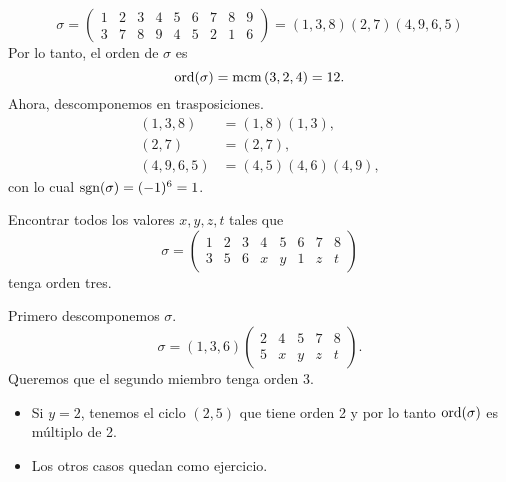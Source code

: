 \begin{ej}
    \[
        \sigma =
        \begin{pmatrix}
            1 & 2 & 3 & 4 & 5 & 6 & 7 & 8 & 9 \\
            3 & 7 & 8 & 9 & 4 & 5 & 2 & 1 & 6
        \end{pmatrix}
        = (1, 3, 8) (2, 7) (4, 9, 6, 5)
    \]
    Por lo tanto, el orden de $\sigma$ es
    \[
        \operatorname{ord}(\sigma) = \operatorname{mcm}\left( 3, 2, 4 \right) = 12.
    \]
    Ahora, descomponemos en trasposiciones.
    \[
        \begin{aligned}
            (1, 3, 8) &= (1, 8) (1, 3), \\
            (2, 7) &= (2, 7), \\
            (4, 9, 6, 5) &= (4, 5) (4, 6) (4, 9),
        \end{aligned}
    \]
    con lo cual $\text{sgn}(\sigma) = (-1)^6 = 1$.
\end{ej}

\begin{ej} %
    Encontrar todos los valores $x, y, z, t$ tales que 
    \[
        \sigma =
        \begin{pmatrix}
            1 & 2 & 3 & 4 & 5 & 6 & 7 & 8 \\
            3 & 5 & 6 & x & y & 1 & z & t
        \end{pmatrix}
    \]
    tenga orden tres.

    Primero descomponemos $\sigma$.
    \[
        \sigma = (1, 3, 6)
        \begin{pmatrix}
            2 & 4 & 5 & 7 & 8 \\
            5 & x & y & z & t
        \end{pmatrix}.
    \]
    Queremos que el segundo miembro tenga orden 3.

    \begin{itemize}
        \item Si $y = 2$, tenemos el ciclo $(2, 5)$ que tiene orden 2 y por lo tanto $\operatorname{ord}(\sigma)$
            es m\'ultiplo de 2.
        \item Los otros casos quedan como ejercicio.%
    \end{itemize}
\end{ej}
